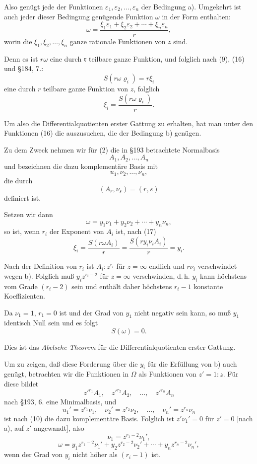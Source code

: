 \documentclass[12pt,a4paper]{article}
\begin{document}
Also genügt jede der Funktionen $\varepsilon_1, \varepsilon_2, \ldots, \varepsilon_n$ der Bedingung a). Umgekehrt ist auch jeder dieser Bedingung genügende Funktion $\omega$ in der Form enthalten:
\begin{equation}\label{eq:198-16}
\omega = \frac{\xi_1\varepsilon_1 + \xi_2\varepsilon_2 + \cdots + \xi_n\varepsilon_n}{r},
\end{equation}
worin die $\xi_1, \xi_2, \ldots, \xi_n$ ganze rationale Funktionen von $z$ sind.

Denn es ist $r\omega$ eine durch $\mathfrak{r}$ teilbare ganze Funktion, und folglich nach (9), (16) und \S 184, 7.:
\[
S(r\omega \varrho_i) = r\xi_i
\]
eine durch $r$ teilbare ganze Funktion von $z$, folglich
\begin{equation}\label{eq:198-17}
\xi_i = \frac{S(r\omega \varrho_i)}{r}.
\end{equation}

Um also die Differentialquotienten erster Gattung zu erhalten, hat man unter den Funktionen (16) die auszusuchen, die der Bedingung b) genügen.

Zu dem Zweck nehmen wir für (2) die in \S 193 betrachtete Normalbasis
\[
A_1, A_2, \ldots, A_n
\]
und bezeichnen die dazu komplementäre Basis mit
\[
u_1, \nu_2, \ldots, \nu_n,
\]
die durch
\begin{equation}\label{eq:198-18}
(A_r, \nu_s) = (r, s)
\end{equation}
definiert ist.

Setzen wir dann
\begin{equation}\label{eq:198-19}
\omega = y_1\nu_1 + y_2\nu_2 + \cdots + y_n\nu_n,
\end{equation}
so ist, wenn $r_i$ der Exponent von $A_i$ ist, nach (17)
\[
\xi_i = \frac{S(r\omega A_i)}{r} = \frac{S(r y_i \nu_i A_i)}{r} = y_i.
\]

Nach der Definition von $r_i$ ist $A_i : z^{r_i}$ für $z = \infty$ endlich und $r\nu_i$ verschwindet wegen b). Folglich muß $y_i z^{r_i-2}$ für $z = \infty$ verschwinden, d.\,h. $y_i$ kann höchstens vom Grade $(r_i - 2)$ sein und enthält daher höchstens $r_i - 1$ konstante Koeffizienten.

Da $\nu_1 = 1$, $r_1 = 0$ ist und der Grad von $y_1$ nicht negativ sein kann, so muß $y_1$ identisch Null sein und es folgt
\[
S(\omega) = 0.
\]

Dies ist das \emph{Abelsche Theorem} für die Differentialquotienten erster Gattung.

Um zu zeigen, daß diese Forderung über die $y_i$ für die Erfüllung von b) auch genügt, betrachten wir die Funktionen in $\Omega$ als Funktionen von $z' = 1:z$. Für diese bildet
\[
z'^{r_1} A_1, \quad z'^{r_2} A_2, \quad \ldots, \quad z'^{r_n} A_n
\]
nach \S 193, 6. eine Minimalbasis, und
\[
u_1' = z^{r_1} \nu_1, \quad \nu_2' = z^{r_2} \nu_2, \quad \ldots, \quad \nu_n' = z^{r_n} \nu_n
\]
ist nach (10) die dazu komplementäre Basis. Folglich ist $z'\nu_1' = 0$ für $z' = 0$ [nach a), auf $z'$ angewandt], also
\[
\nu_1 = z^{r_1-2} \nu_1',
\]
\[
\omega = y_1 z^{r_1-2} \nu_1' + y_2 z^{r_2-2} \nu_2' + \cdots + y_n z^{r_n-2} \nu_n',
\]
wenn der Grad von $y_i$ nicht höher als $(r_i - 1)$ ist.
\end{document}
